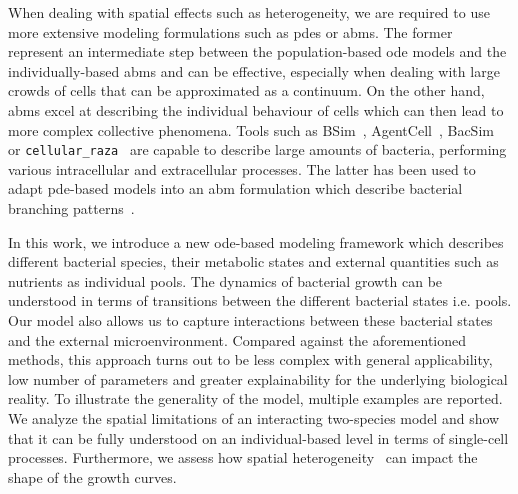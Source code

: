 \documentclass[10pt,A4paper]{article}
\numberwithin{equation}{section}
\begin{document}

When dealing with spatial effects such as heterogeneity, we are required to use more extensive
modeling formulations such as \acp{pde} or \acp{abm}.
The former represent an intermediate step between the population-based \ac{ode} models and the
individually-based \acp{abm} and can be effective, especially when dealing with large crowds of
cells that can be approximated as a continuum.
On the other hand, \acp{abm} excel at describing the individual behaviour of cells which can then
lead to more complex collective phenomena.
Tools such as BSim~\cite{Gorochowski2012,Dang2020}, AgentCell~\cite{emonet_agentcell_2005}, BacSim~\cite{kreft_bacsim_1998} or \texttt{cellular\_raza}~\cite{Pleyer2025} are
capable to describe large amounts of bacteria, performing various intracellular and extracellular
processes.
The latter has been used to adapt \ac{pde}-based models into an \ac{abm} formulation which describe
bacterial branching patterns~\cite{Kawasaki1997,Matsushita1998}.


In this work, we introduce a new \ac{ode}-based modeling framework which describes different
bacterial species, their metabolic states and external quantities such as nutrients as individual
pools.
The dynamics of bacterial growth can be understood in terms of transitions between the different
bacterial states i.e. pools.
Our model also allows us to capture interactions between these bacterial states and the external
microenvironment.
Compared against the aforementioned methods, this approach turns out to be less complex with general
applicability, low number of parameters and greater explainability for the underlying biological
reality.
To illustrate the generality of the model, multiple examples are reported.
We analyze the spatial limitations of an interacting two-species model and show that it can be fully
understood on an individual-based level in terms of single-cell processes.
Furthermore, we assess how spatial heterogeneity~\cite{mckellar_heterogeneous_1997} can impact the shape of the growth curves.
\end{document}
